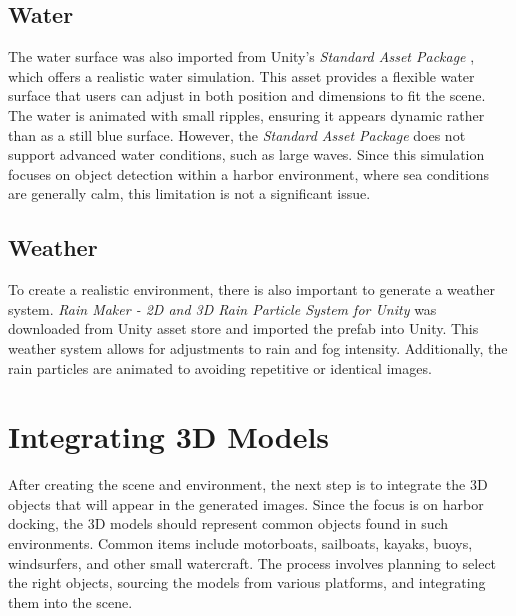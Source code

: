 \subsection{Water}
The water surface was also imported from Unity's \textit{Standard Asset Package} \cite{unity_standard_assets_installation}, which offers a realistic water simulation. This asset provides a flexible water surface that users can adjust in both position and dimensions to fit the scene. The water is animated with small ripples, ensuring it appears dynamic rather than as a still blue surface. However, the \textit{Standard Asset Package} does not support advanced water conditions, such as large waves. Since this simulation focuses on object detection within a harbor environment, where sea conditions are generally calm, this limitation is not a significant issue.

\subsection{Weather}
To create a realistic environment, there is also important to generate a weather system. \textit{Rain Maker - 2D and 3D Rain Particle System for Unity} \cite{unity_rain_maker} was downloaded from Unity asset store and imported the prefab into Unity. This weather system allows for adjustments to rain and fog intensity. Additionally, the rain particles are animated to avoiding repetitive or identical images.

\section{Integrating 3D Models}
After creating the scene and environment, the next step is to integrate the 3D objects that will appear in the generated images. Since the focus is on harbor docking, the 3D models should represent common objects found in such environments. Common items include motorboats, sailboats, kayaks, buoys, windsurfers, and other small watercraft. The process involves planning to select the right objects, sourcing the models from various platforms, and integrating them into the scene.

